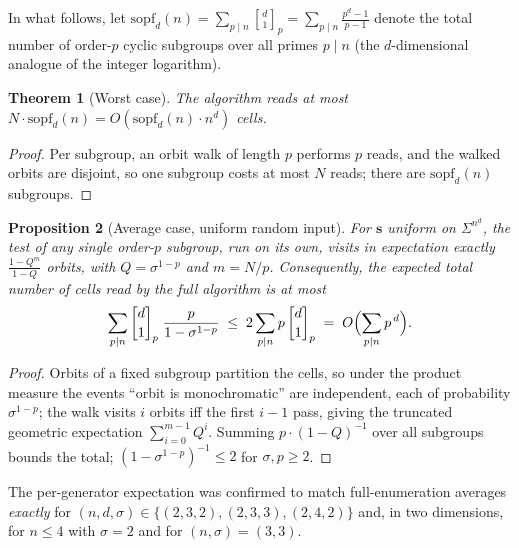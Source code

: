 \documentclass[11pt,a4paper]{article}
\newtheorem{theorem}{Theorem}[section]
\newtheorem{proposition}[theorem]{Proposition}
\theoremstyle{remark}
\newcommand{\ssb}{\mathbf{s}}
\newcommand{\gaussbinom}[2]{\genfrac{[}{]}{0pt}{}{#1}{#2}}
\begin{document}
In what follows, let $\mathrm{sopf}_d(n)=\sum_{p\mid n}\gaussbinom d1_p
=\sum_{p\mid n}\frac{p^d-1}{p-1}$ denote the total number of order-$p$
cyclic subgroups over all primes $p\mid n$ (the $d$-dimensional analogue
of the integer logarithm).

\begin{theorem}[Worst case]\label{thm:detect-worst}
The algorithm reads at most
$N\cdot\mathrm{sopf}_d(n)=O(\mathrm{sopf}_d(n)\cdot n^d)$ cells.
\end{theorem}

\begin{proof}
Per subgroup, an orbit walk of length $p$ performs $p$ reads, and the
walked orbits are disjoint, so one subgroup costs at most $N$ reads;
there are $\mathrm{sopf}_d(n)$ subgroups.
\end{proof}

\begin{proposition}[Average case, uniform random input]
\label{prop:detect-avg}
For $\ssb$ uniform on $\Sigma^{n^d}$, the test of any single order-$p$
subgroup, run on its own, visits in expectation exactly
$\frac{1-Q^{m}}{1-Q}$ orbits, with $Q=\sigma^{1-p}$ and $m=N/p$. Consequently, the
expected total number of cells read by the full algorithm is at most
\[
    \sum_{p\mid n}\gaussbinom d1_p\;\frac{p}{1-\sigma^{1-p}}
    \;\le\; 2\sum_{p\mid n}p\,\gaussbinom d1_p
    \;=\;O\Bigl(\sum_{p\mid n}p^{\,d}\Bigr).
\]
\end{proposition}

\begin{proof}
Orbits of a fixed subgroup partition the cells, so under the product
measure the events ``orbit is monochromatic'' are independent, each of
probability $\sigma^{1-p}$; the walk visits $i$ orbits iff the first
$i-1$ pass, giving the truncated geometric expectation
$\sum_{i=0}^{m-1}Q^i$. Summing $p\cdot(1-Q)^{-1}$ over all subgroups
bounds the total; $(1-\sigma^{1-p})^{-1}\le2$ for $\sigma,p\ge2$.
\end{proof}

The per-generator expectation was confirmed to match full-enumeration
averages \emph{exactly} for $(n,d,\sigma)\in\{(2,3,2),(2,3,3),(2,4,2)\}$
and, in two dimensions, for $n\le4$ with $\sigma=2$ and for $(n,\sigma)=(3,3)$.
\end{document}
